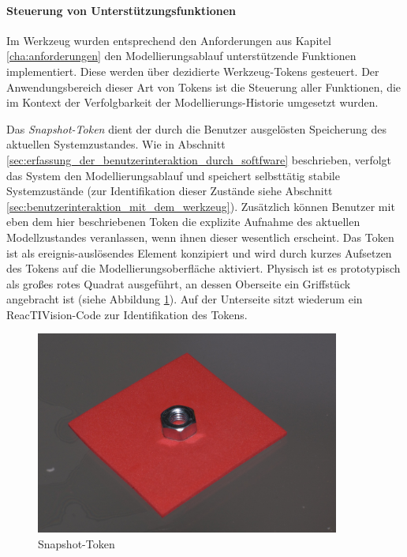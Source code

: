 \paragraph{Steuerung von Unterstützungsfunktionen} %
\label{par:steuerung_von_unterstützungsfunktionen}

Im Werkzeug wurden entsprechend den Anforderungen aus Kapitel \ref{cha:anforderungen} den Modellierungsablauf unterstützende Funktionen implementiert. Diese werden über dezidierte Werkzeug-Tokens gesteuert. Der Anwendungsbereich dieser Art von Tokens ist die Steuerung aller Funktionen, die im Kontext der Verfolgbarkeit der Modellierungs-Historie umgesetzt wurden. 

Das \emph{Snapshot-Token} dient der durch die Benutzer ausgelösten Speicherung des aktuellen Systemzustandes. Wie in Abschnitt \ref{sec:erfassung_der_benutzerinteraktion_durch_softfware} beschrieben, verfolgt das System den Modellierungsablauf und speichert selbsttätig stabile Systemzustände (zur Identifikation dieser Zustände siehe Abschnitt \ref{sec:benutzerinteraktion_mit_dem_werkzeug}). Zusätzlich können Benutzer mit eben dem hier beschriebenen Token die explizite Aufnahme des aktuellen Modellzustandes veranlassen, wenn ihnen dieser wesentlich erscheint. Das Token ist als ereignis-auslösendes Element konzipiert und wird durch kurzes Aufsetzen des Tokens auf die Modellierungsoberfläche aktiviert. Physisch ist es prototypisch als großes rotes Quadrat ausgeführt, an dessen Oberseite ein Griffstück angebracht ist (siehe Abbildung \ref{fig:img_SystemNeu_Snapshottoken}). Auf der Unterseite sitzt wiederum ein ReacTIVision-Code zur Identifikation des Tokens.

\begin{figure}[htbp]
	\centering
		\includegraphics[width=10cm]{img/SystemNeu/Snapshottoken.jpg}
	\caption{Snapshot-Token}
	\label{fig:img_SystemNeu_Snapshottoken}
\end{figure}

